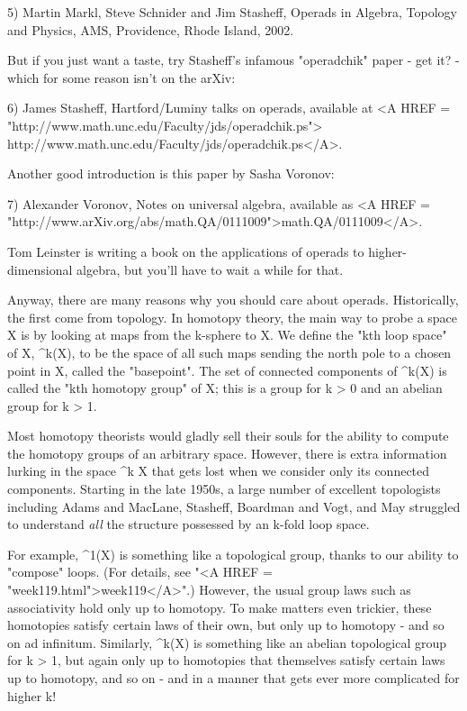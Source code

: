 5)  Martin Markl, Steve Schnider and Jim Stasheff, Operads in Algebra, 
Topology and Physics, AMS, Providence, Rhode Island, 2002. 

But if you just want a taste, try Stasheff's infamous "operadchik" paper -
get it? - which for some reason isn't on the arXiv:

6) James Stasheff, Hartford/Luminy talks on operads, available
at <A HREF = "http://www.math.unc.edu/Faculty/jds/operadchik.ps">  
http://www.math.unc.edu/Faculty/jds/operadchik.ps</A>.  

Another good introduction is this paper by Sasha Voronov:

7) Alexander Voronov, Notes on universal algebra, available as
<A HREF = "http://www.arXiv.org/abs/math.QA/0111009">math.QA/0111009</A>.

Tom Leinster is writing a book on the applications of operads to 
higher-dimensional algebra, but you'll have to wait a while for that.

Anyway, there are many reasons why you should care about operads.
Historically, the first come from topology.  In homotopy theory, the
main way to probe a space X is by looking at maps from the k-sphere to
X.  We define the "kth loop space" of X, \Omega ^{k}(X),
to be the space of all such maps sending the north pole to a chosen
point in X, called the "basepoint".  The set of connected
components of \Omega ^{k}(X) is called the "kth homotopy
group" of X; this is a group for k > 0 and an abelian group for
k > 1.

Most homotopy theorists would gladly sell their souls for the ability to
compute the homotopy groups of an arbitrary space.  However, there is
extra information lurking in the space \Omega ^{k} X that gets lost when
we consider only its connected components.  Starting in the late 1950s,
a large number of excellent topologists including Adams and MacLane,
Stasheff, Boardman and Vogt, and May struggled to understand \emph{all} the 
structure possessed by an k-fold loop space.  


For example, \Omega ^{1}(X) is something like a topological group,
thanks to our ability to "compose" loops.  (For details, see
"<A HREF = "week119.html">week119</A>".)  However, the usual
group laws such as associativity hold only up to homotopy.  To make
matters even trickier, these homotopies satisfy certain laws of their
own, but only up to homotopy - and so on ad infinitum.  Similarly,
\Omega ^{k}(X) is something like an abelian topological group for
k > 1, but again only up to homotopies that themselves satisfy
certain laws up to homotopy, and so on - and in a manner that gets ever
more complicated for higher k!

